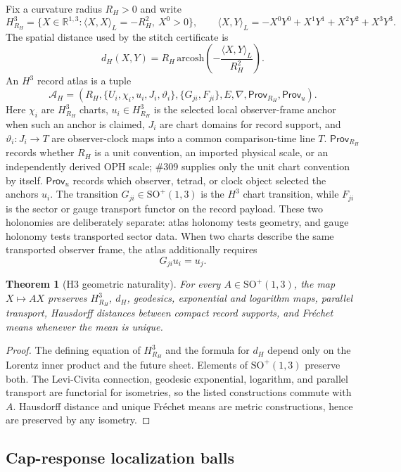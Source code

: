 \documentclass[11pt]{article}
\newtheorem{theorem}{Theorem}[section]
\begin{document}
Fix a curvature radius \(R_H>0\) and write
\[
H^3_{R_H}=\{X\in\mathbb R^{1,3}:\langle X,X\rangle_L=-R_H^2,\ X^0>0\},
\qquad
\langle X,Y\rangle_L=-X^0Y^0+X^1Y^1+X^2Y^2+X^3Y^3 .
\]
The spatial distance used by the stitch certificate is
\[
d_H(X,Y)=R_H\,\mathrm{arcosh}\!\left(-\frac{\langle X,Y\rangle_L}{R_H^2}\right).
\]
An \(H^3\) record atlas is a tuple
\[
\mathcal A_H=
\left(
R_H,\{U_i,\chi_i,u_i,J_i,\vartheta_i\},\{G_{ji},F_{ji}\},E,\nabla,
\mathsf{Prov}_{R_H},\mathsf{Prov}_u
\right).
\]
Here \(\chi_i\) are \(H^3_{R_H}\) charts, \(u_i\in H^3_{R_H}\) is the selected local observer-frame
anchor when such an anchor is claimed, \(J_i\) are chart domains for record support, and
\(\vartheta_i:J_i\to T\) are observer-clock maps into a common comparison-time line \(T\).
\(\mathsf{Prov}_{R_H}\) records whether \(R_H\) is a unit convention, an imported physical scale, or
an independently derived OPH scale; \#309 supplies only the unit chart convention by itself.
\(\mathsf{Prov}_u\) records which observer, tetrad, or clock object selected the anchors \(u_i\).
The transition \(G_{ji}\in\mathrm{SO}^{+}(1,3)\) is the \(H^3\) chart transition, while
\(F_{ji}\) is the sector or gauge transport functor on the record payload. These two holonomies
are deliberately separate: atlas holonomy tests geometry, and gauge holonomy tests transported
sector data. When two charts describe the same transported observer frame, the atlas additionally
requires
\[
G_{ji}u_i=u_j.
\]

\begin{theorem}[H3 geometric naturality]\label{thm:h3-geometric-naturality}
For every \(A\in\mathrm{SO}^{+}(1,3)\), the map \(X\mapsto AX\) preserves \(H^3_{R_H}\),
\(d_H\), geodesics, exponential and logarithm maps, parallel transport, Hausdorff distances between
compact record supports, and Fr\'echet means whenever the mean is unique.
\end{theorem}

\begin{proof}
The defining equation of \(H^3_{R_H}\) and the formula for \(d_H\) depend only on the Lorentz
inner product and the future sheet. Elements of \(\mathrm{SO}^{+}(1,3)\) preserve both. The
Levi-Civita connection, geodesic exponential, logarithm, and parallel transport are functorial for
isometries, so the listed constructions commute with \(A\). Hausdorff distance and unique
Fr\'echet means are metric constructions, hence are preserved by any isometry.
\end{proof}

\subsection{Cap-response localization balls}
\end{document}
